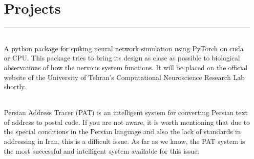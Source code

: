 \documentclass[]{rahulworld-resume}
\begin{document}
\begin{minipage}[t]{0.6\textwidth} 
\section{Projects}
\noindent\rule{11.5cm}{0.4pt}
 
\noindent
\hspace{5em}%
\begin{minipage}{0.85\textwidth\vspace{5pt}}
	\vspace{3pt}\\
	A python package for spiking neural network simulation using PyTorch on cuda or CPU.
	This package tries to bring its design as close as possible to biological observations of how the nervous system functions.
	It will be placed on the official website of the University of Tehran's Computational Neuroscience Research Lab shortly.\\
\end{minipage}
 
\noindent
\hspace{5em}%
\begin{minipage}{0.85\textwidth\vspace{0pt}}
	\vspace{3pt}\\
	Persian Address Tracer (PAT) is an intelligent system for converting Persian text of address to postal code.
	If you are not aware, it is worth mentioning that due to the special conditions in the Persian language and
	also the lack of standards in addressing in Iran, this is a difficult issue.
	As far as we know, the PAT system is the most successful and intelligent system available for this issue.\\
\end{minipage}

\end{minipage}
\end{document}
